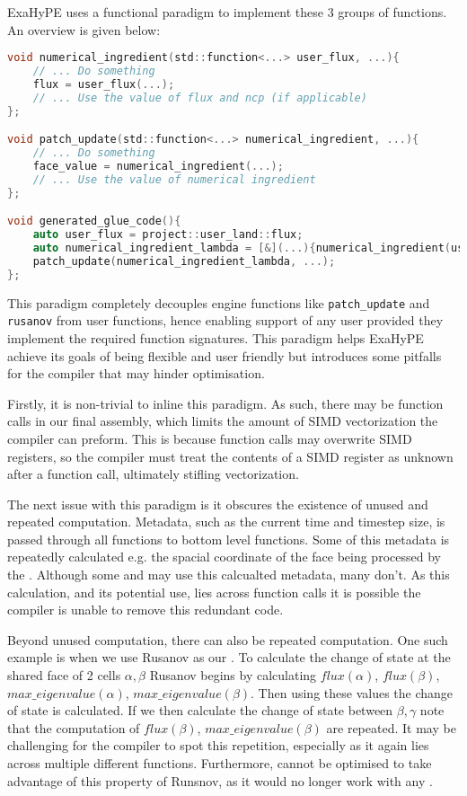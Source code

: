 ExaHyPE uses a functional paradigm to implement these 3 groups of functions.
An overview is given below:
\begin{lstlisting}[language=c]
void numerical_ingredient(std::function<...> user_flux, ...){
    // ... Do something
    flux = user_flux(...);
    // ... Use the value of flux and ncp (if applicable) 
};

void patch_update(std::function<...> numerical_ingredient, ...){
    // ... Do something
    face_value = numerical_ingredient(...);
    // ... Use the value of numerical ingredient
};

void generated_glue_code(){
    auto user_flux = project::user_land::flux;
    auto numerical_ingredient_lambda = [&](...){numerical_ingredient(user_flux, ...)};
    patch_update(numerical_ingredient_lambda, ...);
};
\end{lstlisting}
This paradigm completely decouples engine functions like \lstinline{patch_update} and \lstinline{rusanov} from user functions, hence enabling support of any user  provided they implement the required function signatures.
This paradigm helps ExaHyPE achieve its goals of being flexible and user friendly but introduces some pitfalls for the compiler that may hinder optimisation.

Firstly, it is non-trivial to inline this paradigm.
As such, there may be function calls in our final assembly, which limits the amount of SIMD vectorization the compiler can preform.
This is because function calls may overwrite SIMD registers, so the compiler must treat the contents of a SIMD register as unknown after a function call, ultimately stifling vectorization.

The next issue with this paradigm is it obscures the existence of unused and repeated computation.
Metadata, such as the current time and timestep size, is passed through all functions to bottom level  functions.
Some of this metadata is repeatedly calculated e.g. the spacial coordinate of the face being processed by the .
Although some  and  may use this calcualted metadata, many don't.
As this calculation, and its potential use, lies across function calls it is possible the compiler is unable to remove this redundant code.

Beyond unused computation, there can also be repeated computation.
One such example is when we use Rusanov as our .
To calculate the change of state at the shared face of 2 cells $\alpha,\beta$ Rusanov begins by calculating $flux(\alpha)$, $flux(\beta)$, $max\_eigenvalue(\alpha)$, $max\_eigenvalue(\beta)$.
Then using these values the change of state is calculated.
If we then calculate the change of state between $\beta,\gamma$ note that the computation of $flux(\beta)$, $max\_eigenvalue(\beta)$ are repeated.
It may be challenging for the compiler to spot this repetition, especially as it again lies across multiple different functions.
Furthermore,  cannot be optimised to take advantage of this property of Runsnov, as it would no longer work with any .


